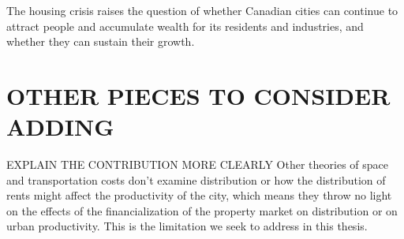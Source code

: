 The housing crisis raises the question of whether Canadian cities can continue to attract people and accumulate wealth for its residents and industries, and whether they can sustain their growth.
















\section{OTHER PIECES TO CONSIDER ADDING}
EXPLAIN THE CONTRIBUTION MORE CLEARLY
Other theories of space and transportation costs  don't examine distribution or how the distribution of rents might affect the productivity of the city, which means they throw no light on the effects of the financialization of the property market on distribution or on urban productivity.  This is the limitation we seek to address in this thesis. 

